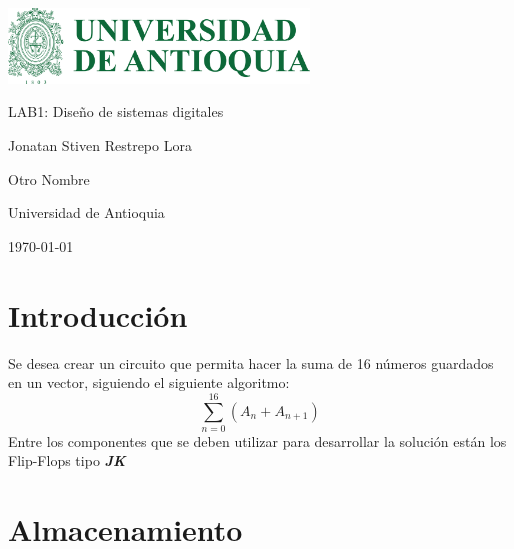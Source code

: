 \documentclass{article}
\begin{document}
\thispagestyle{fancy} %
\begin{titlepage}
    \centering
    \vspace*{2cm}
    {\includegraphics[width=8cm]{imagenes/logo.png}\par} %
    \vspace{1cm}
    {\Huge LAB1: Diseño de sistemas digitales\par}
    \vspace{2cm}
    {\Large Jonatan Stiven Restrepo Lora\par}
    \vspace{0.5cm}
    {\Large Otro Nombre\par} %
    \vspace{0.5cm}
    {\Large Universidad de Antioquia\par} %
    \vfill
    {\large \today\par}
\end{titlepage}

\section{Introducción}
Se desea crear un circuito que permita hacer la suma de 16 números guardados en un vector, 
siguiendo el siguiente algoritmo:
\[
\sum_{n=0}^{16} (A_n + A_{n+1})
\]
Entre los componentes que se deben utilizar para desarrollar la solución están los Flip-Flops
tipo \textbf{\textit{JK}}

\section{Almacenamiento}
\end{document}
